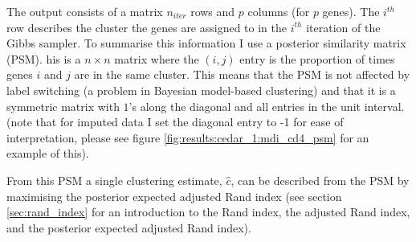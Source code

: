 \documentclass[12pt]{article} %
\begin{document}
	
	The output consists of a matrix $n_{iter}$ rows and $p$ columns (for $p$ genes). The $i^{th}$ row describes the cluster the genes are assigned to in the $i^{th}$ iteration of the Gibbs sampler. To summarise this information I use a posterior similarity matrix (PSM). his is a $n \times n$ matrix where the $(i,j)$ entry is the proportion of times genes $i$ and $j$ are in the same cluster. This means that the PSM is not affected by label switching (a problem in Bayesian model-based clustering) and that it is a symmetric matrix with $1$'s along the diagonal and all entries in the unit interval. (note that for imputed data I set the diagonal entry to -1 for ease of interpretation, please see figure \ref{fig:results:cedar_1:mdi_cd4_psm} for an example of this).
	
	From this PSM a single clustering estimate, $\hat{c}$, can be described from the PSM by maximising the posterior expected adjusted Rand index \citep{FritschImprovedcriteriaclustering2009} (see section \ref{sec:rand_index} for an introduction to the Rand index, the adjusted Rand index, and the posterior expected adjusted Rand index).
	
	
\end{document}
